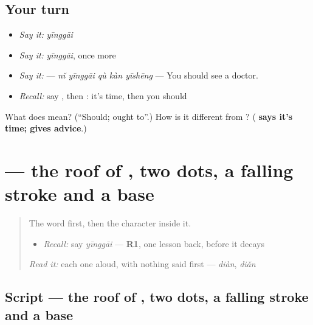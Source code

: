 \subsection*{Your turn}
\begin{itemize}
\raggedright
  \item \emph{Say it:} \emph{yīnggāi}
  \item \emph{Say it:} \emph{yīnggāi}, once more
  \item \emph{Say it:}  — \emph{nǐ yīnggāi qù kàn yīshēng} — You should see a doctor.
  \item \emph{Recall:} say , then : it's time, then you should
\end{itemize}

\begin{tcolorbox}[breakable,colback=teal!4,colframe=teal!35!black,title={Before you move on}]
What does  mean? (\textquotedblleft{}Should; ought to\textquotedblright{}.) How is it different from ? (\textbf{ says it's time;  gives advice}.)
\end{tcolorbox}
\section[\texorpdfstring{\zh{应} (yīng)}{应 (yīng)}]{ — the roof of , two dots, a falling stroke and a base}

\label{lesson:ZH-W282-ying}



\begin{quote}
The word first, then the character inside it.

\begin{itemize}
\raggedright
  \item \emph{Recall:} say \emph{yīnggāi} — \textbf{R1}, one lesson back, before it decays
\end{itemize}

\begin{quote}
 
\end{quote}

\emph{Read it:} each one aloud, with nothing said first — \emph{diàn}, \emph{diǎn}
\end{quote}

\subsection*{Script — the roof of , two dots, a falling stroke and a base}

